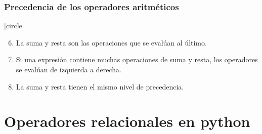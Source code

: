 {\begin{frame}
\begin{enumerate}[<+->]
\end{enumerate}
\end{frame}
\begin{frame}
\frametitle{Precedencia de los operadores aritméticos}
[circle]
\begin{enumerate}[<+->]
\setcounter{enumi}{5}
\item La suma y resta son las operaciones que se evalúan al último. 
\item Si una expresión contiene muchas operaciones de suma y resta, los operadores se evalúan de izquierda a derecha.
\item La suma y resta tienen el mismo nivel de precedencia.
\end{enumerate}
\end{frame}
\section{Operadores relacionales en python}
}
